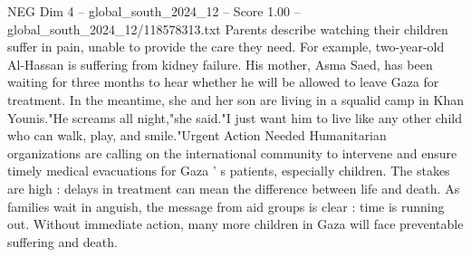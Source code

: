 \begin{textsample}{NEG Dim 4 – global\_south\_2024\_12 – Score 1.00 – global\_south\_2024\_12/118578313.txt}
Parents describe watching their children suffer in pain, unable to provide the care they need.
For example, two-year-old Al-Hassan is suffering from kidney failure.
His mother, Asma Saed, has been waiting for three months to hear whether he will be allowed to leave Gaza for treatment.
In the meantime, she and her son are living in a squalid camp in Khan Younis."He screams all night,"she said."I just want him to live like any other child who can walk, play, and smile."Urgent Action Needed Humanitarian organizations are calling on the international community to intervene and ensure timely medical evacuations for Gaza ' s patients, especially children.
The stakes are high : delays in treatment can mean the difference between life and death.
As families wait in anguish, the message from aid groups is clear : time is running out.
Without immediate action, many more children in Gaza will face preventable suffering and death.

\end{textsample}
